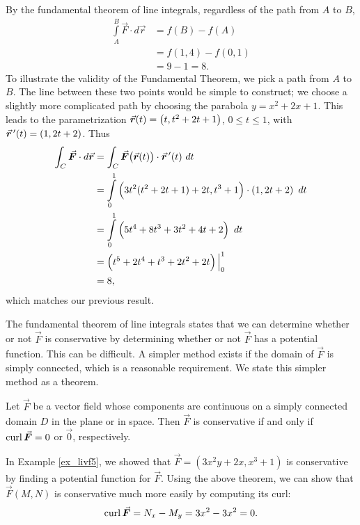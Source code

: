 \begin{example}
By the fundamental theorem of line integrals, regardless of the path from $A$ to $B$, 
\begin{align*}
\int\limits_A^B\vec F\cdot d\vec r &= f(B) - f(A) \\[-0.3cm]
			&= f(1,4) - f(0,1) \\
			&= 9 - 1 = 8.
\end{align*}
To illustrate the validity of the Fundamental Theorem, we pick a path from $A$ to $B$. The line between these two points would be simple to construct; we choose a slightly more complicated path by choosing the parabola $y = x^2+2x+1$. This leads to the parametrization $\vrt = \left( t, t^2+2t+1\right)$, $0\leq t\leq 1$, with $\vrp(t) = \left( 1, 2t+2\right)$. Thus
\begin{align*}
\int_C \vec F\cdot d\vec r &= \int_C\vec F\big(\vrt\big)\cdot\vrp(t)\ dt\\
				&= \int\limits_0^1\left( 3t^2(t^2+2t+1)+2t, t^3+1\right)\cdot\left( 1,2t+2\right)\ dt\\
				&= \int\limits_0^1 \left(5t^4+8t^3+3t^2+4t+2\right)\ dt\\
				&= \left(t^5+2t^4+t^3+2t^2+2t\right)\Big|_0^1\\
				&= 8,
\end{align*}				
which matches our previous result.
\end{example}

The fundamental theorem of line integrals states that we can determine whether or not $\vec F$ is conservative by determining whether or not $\vec F$ has a potential function. This can be difficult. A simpler method exists if the domain of $\vec F$ is simply connected, which is a reasonable requirement. We state this simpler method as a theorem.


\begin{theorem}\label{thm:conservative_field_curl}
Let $\vec F$ be a vector field whose components are continuous on a simply connected domain $D$ in the plane or in space. Then $\vec F$ is conservative if and only if $\curl \vec F = 0$ or $\vec 0$, respectively.
\end{theorem}

In Example \ref{ex_livf5}, we showed that $\vec F =\left( 3x^2y+2x,x^3+1\right)$ is conservative by finding a potential function for $\vec F$. Using the above theorem, we can show that $\vec F(M,N)$ is conservative much more easily by computing its curl:
$$\curl \vec F = N_x - M_y = 3x^2 - 3x^2 = 0.$$





